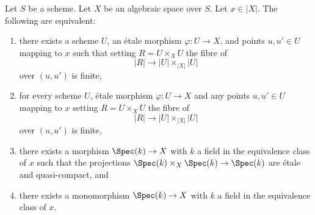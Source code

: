 %
\begin{lemma}
\label{lemma-R-finite-above-x}
Let $S$ be a scheme. Let $X$ be an algebraic space over $S$.
Let $x \in |X|$. The following are equivalent:
\begin{enumerate}
\item there exists a scheme $U$, an \'etale morphism
$\varphi : U \to X$, and points $u, u' \in U$ mapping to
$x$ such that setting $R = U \times_X U$ the fibre of
$$
|R| \to |U| \times_{|X|} |U|
$$
over $(u, u')$ is finite,
\item for every scheme $U$, \'etale morphism $\varphi : U \to X$ and
any points $u, u' \in U$ mapping to
$x$ setting $R = U \times_X U$ the fibre of
$$
|R| \to |U| \times_{|X|} |U|
$$
over $(u, u')$ is finite,
\item there exists a morphism $\Spec(k) \to X$ with $k$ a field
in the equivalence class of $x$ such that the projections
$\Spec(k) \times_X \Spec(k) \to \Spec(k)$ are
\'etale and quasi-compact, and
\item there exists a monomorphism $\Spec(k) \to X$ with $k$ a field
in the equivalence class of $x$.
\end{enumerate}
\end{lemma}

